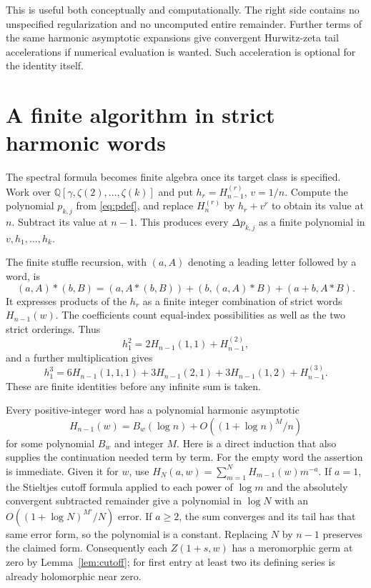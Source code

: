 \documentclass[11pt,a4paper]{article}
\numberwithin{equation}{section}
\theoremstyle{definition}
\theoremstyle{remark}
\newcommand{\Q}{\mathbb Q}
\begin{document}
This is useful both conceptually and computationally.  The right side
contains no unspecified regularization and no uncomputed entire
remainder.  Further terms of the same harmonic asymptotic expansions
give convergent Hurwitz-zeta tail accelerations if numerical evaluation
is wanted.  Such acceleration is optional for the identity itself.

\section{A finite algorithm in strict harmonic words}
\label{sec:algorithm}

The spectral formula becomes finite algebra once its target class is
specified.  Work over $\Q[\gamma,\zeta(2),\ldots,\zeta(k)]$ and put
$h_r=H_{n-1}^{(r)}$, $v=1/n$.  Compute the polynomial
$p_{k,j}$ from \eqref{eq:pdef}, and replace $H_n^{(r)}$ by
$h_r+v^r$ to obtain its value at $n$.  Subtract its value at $n-1$.
This produces every $\Delta p_{k,j}$ as a finite polynomial in
$v,h_1,\ldots,h_k$.

The finite stuffle recursion, with $(a,A)$ denoting a leading letter
followed by a word, is
\begin{equation}
 (a,A)*(b,B)=(a,A*(b,B))+(b,(a,A)*B)+(a+b,A*B).
 \label{eq:stuffle}
\end{equation}
It expresses products of the $h_r$ as a finite integer combination
of strict words $H_{n-1}(w)$.  The coefficients count equal-index
possibilities as well as the two strict orderings.  Thus
\[
        h_1^2=2H_{n-1}(1,1)+H_{n-1}^{(2)},
\]
and a further multiplication gives
\[
 h_1^3=6H_{n-1}(1,1,1)+3H_{n-1}(2,1)
                  +3H_{n-1}(1,2)+H_{n-1}^{(3)}.
\]
These are finite identities before any infinite sum is taken.

Every positive-integer word has a polynomial harmonic asymptotic
\begin{equation}
 H_{n-1}(w)=B_w(\log n)+O((1+\log n)^M/n)
 \label{eq:word-asymptotic}
\end{equation}
for some polynomial $B_w$ and integer $M$.  Here is a direct induction
that also supplies the continuation needed term by term.  For the
empty word the assertion is immediate.  Given it for $w$, use
$H_N(a,w)=\sum_{m=1}^N H_{m-1}(w)m^{-a}$.  If $a=1$,
the Stieltjes cutoff formula applied to each power of $\log m$
and the absolutely convergent subtracted remainder give a
polynomial in $\log N$ with an
$O((1+\log N)^{M'}/N)$ error.  If $a\ge2$, the sum converges
and its tail has that same error form, so the polynomial is a
constant.  Replacing $N$ by $n-1$ preserves the claimed form.
Consequently each $Z(1+s,w)$ has a meromorphic germ at zero by
Lemma~\ref{lem:cutoff}; for first entry at least two its defining
series is already holomorphic near zero.
\end{document}
